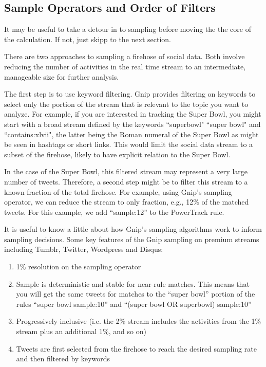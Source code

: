 \documentclass{article}
\begin{document}
\subsection{Sample Operators and Order of Filters} 

It may be useful to take a detour in to sampling before moving the the core of the calculation.  If not, just skipp to the next section.

There are two approaches to sampling a firehose of social data. Both involve reducing the number of activities in the real time stream to an intermediate, manageable size for further analysis.

The first step is to use keyword filtering.  Gnip provides filtering on keywords to select only the portion of the stream that is relevant to the topic you want to analyze. For example, if you are interested in tracking the Super Bowl, you might start with a broad stream defined by the keywords ``superbowl" ``super bowl" and ``contains:xlvii", the latter being the Roman numeral of the Super Bowl as might be seen in hashtags or short links. This would limit the social data stream to a subset of the firehose, likely to have explicit relation to the Super Bowl.

In the case of the Super Bowl, this filtered stream may represent a very large number of tweets.  Therefore, a second step might be to filter this stream to a known fraction of the total firehose. For example, using Gnip's sampling operator, we can reduce the stream to only fraction, e.g., 12\% of the matched tweets. For this example, we add ``sample:12'' to the PowerTrack rule.

It is useful to know a little about how Gnip's sampling algorithms work to inform sampling decisions.  Some key features of the Gnip sampling on premium streams including Tumblr, Twitter, Wordpress and Disqus:

\begin{enumerate}
	\item 1\% resolution on the sampling operator
	\item Sample is deterministic and stable for near-rule matches.  This means that you will get the same tweets for matches to the ``super bowl'' portion of the rules ``super bowl sample:10'' and ``(super bowl OR superbowl) sample:10''
	\item Progressively inclusive (i.e. the 2\% stream includes the activities from the 1\% stream plus an additional 1\%,  and so on)
	\item Tweets are first selected from the firehose to reach the desired sampling rate and then filtered by keywords 
\end{enumerate}
\end{document}
